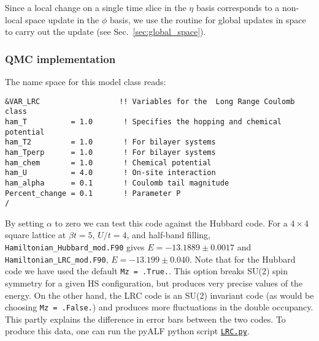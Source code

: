Since a local change on  a single time slice in the $\eta$ basis corresponds to a non-local space update  in the $\phi$ basis, we  use the routine for global updates in space to carry out the update (see Sec.~\ref{sec:global_space}). 

\subsubsection*{ QMC implementation } 

The name space for this model class  reads: 

\begin{lstlisting}[style=fortran,escapechar=\#,breaklines=true]
&VAR_LRC                  !! Variables for the  Long Range Coulomb class
ham_T          = 1.0       ! Specifies the hopping and chemical potential
ham_T2         = 1.0       ! For bilayer systems
ham_Tperp      = 1.0       ! For bilayer systems
ham_chem       = 1.0       ! Chemical potential
ham_U          = 4.0       ! On-site interaction
ham_alpha      = 0.1       ! Coulomb tail magnitude
Percent_change = 0.1       ! Parameter P 
/
\end{lstlisting}

By setting $\alpha$ to zero we can test this code against the Hubbard code.   For a   $ 4 \times 4 $ square  lattice at $ \beta t = 5$, $U/t = 4$, and half-band filling,     \texttt{Hamiltonian\_Hubbard\_mod.F90}  gives $ E = -13.1889 \pm  0.0017 $  and \texttt{Hamiltonian\_LRC\_mod.F90}, $E = -13.199 \pm  0.040 $.    Note that for the  Hubbard code we have used  the default \texttt{Mz = .True.}.   This  option   breaks SU(2) spin symmetry for a given HS configuration, but produces very precise values of the energy. On the other hand,  the LRC code  is an SU(2) invariant code (as would be  choosing \texttt{Mz = .False.})  and  produces  more  fluctuations in the double occupancy.   This  partly explains the difference in  error  bars between the two codes.    To produce this data, one  can run the pyALF  python script \href{https://git.physik.uni-wuerzburg.de/ALF/pyALF/-/blob/ALF-2.0/Scripts/LRC.py}{\texttt{LRC.py}}.
  



